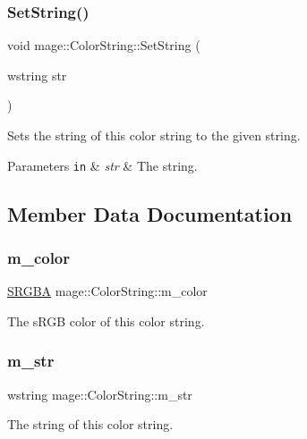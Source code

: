 \subsubsection{\texorpdfstring{Set\+String()}{SetString()}}
{\footnotesize\ttfamily void mage\+::\+Color\+String\+::\+Set\+String (\begin{DoxyParamCaption}\item[{wstring}]{str }\end{DoxyParamCaption})\hspace{0.3cm}{\ttfamily [noexcept]}}

Sets the string of this color string to the given string.


\begin{DoxyParams}[1]{Parameters}
\mbox{\tt in}  & {\em str} & The string. \\
\hline
\end{DoxyParams}


\subsection{Member Data Documentation}
\hypertarget{classmage_1_1_color_string_a6c374792eb5c6657e54b1d1e8ae26f71}{}\label{classmage_1_1_color_string_a6c374792eb5c6657e54b1d1e8ae26f71} 
\subsubsection{\texorpdfstring{m\+\_\+color}{m\_color}}
{\footnotesize\ttfamily \hyperlink{structmage_1_1_s_r_g_b_a}{S\+R\+G\+BA} mage\+::\+Color\+String\+::m\+\_\+color\hspace{0.3cm}{\ttfamily [private]}}

The s\+R\+GB color of this color string. \hypertarget{classmage_1_1_color_string_a9eb840afa5112cd611f5bb1b21edc045}{}\label{classmage_1_1_color_string_a9eb840afa5112cd611f5bb1b21edc045} 
\subsubsection{\texorpdfstring{m\+\_\+str}{m\_str}}
{\footnotesize\ttfamily wstring mage\+::\+Color\+String\+::m\+\_\+str\hspace{0.3cm}{\ttfamily [private]}}

The string of this color string. 